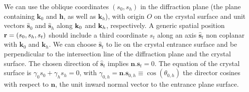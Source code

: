 \documentclass{iucr}
\begin{document}
We can use the oblique coordinates $(s_0,s_h)$ in the diffraction plane (the plane containing $\textbf{k}_0$ and $\textbf{h}$, as well as $\textbf{k}_h$),
with origin $O$ on the crystal surface and unit vectors 
$\hat{ \textbf{s}}_{0}$ and $\hat{ \textbf{s}}_{h}$ along $\textbf k_0$ and $\textbf k_h$, respectively.
A generic spatial position  $\textbf r=(s_0,s_h,s_t)$ should include a third coordinate $s_t$ along an axis $\hat{\textbf{s}}_t$ non coplanar with $\textbf{k}_0$ and $\textbf{k}_h$.
We can choose $\hat{ \textbf{s}}_{t}$ to lie on the crystal entrance surface and be perpendicular to the intersection line of the diffraction plane and the crystal surface.
The chosen direction of $\hat{\textbf{s}}_{t}$ implies $
\textbf{n}.\textbf{s}_t=0$.
The equation of the crystal surface is $\gamma_0 s_0 + \gamma_h s_h =0$, with $\gamma_{0,h}=\textbf{n}.\textbf{s}_{0,h} \equiv \cos(\theta_{0,h})$ the director cosines with respect to $\textbf{n}$, the unit inward normal vector to the entrance plane surface.
\end{document}
